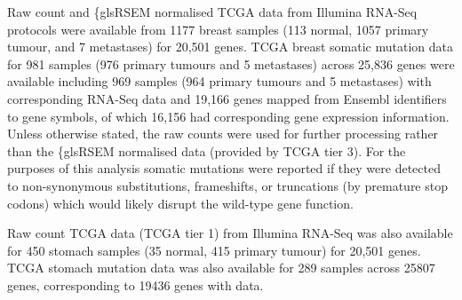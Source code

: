 Raw count and \{gls{RSEM} normalised \gls{TCGA}  data from Illumina \acrshort{RNA}-Seq protocols were available from 1177 breast samples (113 normal, 1057 primary tumour, and 7 metastases) for 20,501 genes. \gls{TCGA} breast \gls{somatic} \gls{mutation} data for 981 samples (976 primary tumours and 5 metastases) across 25,836 genes were available including 969 samples (964 primary tumours and 5 metastases) with corresponding \acrshort{RNA}-Seq  data and 19,166 genes mapped from Ensembl identifiers to gene symbols, of which 16,156 had corresponding \gls{gene expression} information. Unless otherwise stated, the raw counts were used for further processing rather than the \{gls{RSEM} normalised data (provided by \gls{TCGA} tier 3). For the purposes of this analysis \gls{somatic} \glspl{mutation} were reported if they were detected to non-synonymous substitutions, frameshifts, or truncations (by premature stop codons) which would likely disrupt the \gls{wild-type} gene function. %

Raw count \gls{TCGA}  data (\gls{TCGA} tier 1) from Illumina \acrshort{RNA}-Seq was also available for 450 stomach samples (35 normal, 415 primary tumour) for 20,501 genes. \gls{TCGA} stomach \gls{mutation} data was also available for 289 samples across 25807 genes, corresponding to 19436 genes with  data. %



